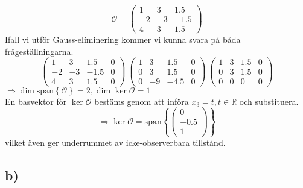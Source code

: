 \documentclass[12pt]{article}
\newcommand{\sspan}[1]{\mathrm{span}\left\{#1\right\}}
\begin{document}
\begin{equation*}
  \mathcal{O} =
  \begin{pmatrix}
    1 & 3 & 1.5 \\
    -2 & -3 & -1.5 \\
    4 & 3 & 1.5
  \end{pmatrix}
\end{equation*}
Ifall vi utför Gauss-elíminering kommer vi kunna svara på båda frågeställningarna.
\begin{equation*}
  \left(
  \begin{array}{ccc|c}
    1 & 3 & 1.5 & 0\\
    -2 & -3 & -1.5 & 0 \\
    4 & 3 & 1.5 & 0
  \end{array}\right) ~ 
\left(
  \begin{array}{ccc|c}
    1 & 3 & 1.5 & 0 \\
    0 & 3 & 1.5 & 0 \\
    0 & -9 & -4.5 & 0
  \end{array}
\right) ~ \left(
  \begin{array}{ccc|c}
    1 & 3 & 1.5 & 0 \\
    0 & 3 & 1.5 & 0 \\
    0 & 0 & 0 & 0
  \end{array}
\right)
\end{equation*}
$\Rightarrow \dim{\sspan{\mathcal{O}}} = 2, \dim{\ker{\mathcal{O}}} = 1$ \\
En basvektor för $\ker{\mathcal{O}}$ bestäms genom att införa $x_3 = t, t \in \mathbb{R}$ och substituera.
\[\Rightarrow \ker{\mathcal{O}} = \sspan{
  \begin{pmatrix}
    0 \\
    -0.5 \\
    1
  \end{pmatrix}
}\]
vilket även ger underrummet av icke-observerbara tillstånd.

\subsection*{b)}
\end{document}
